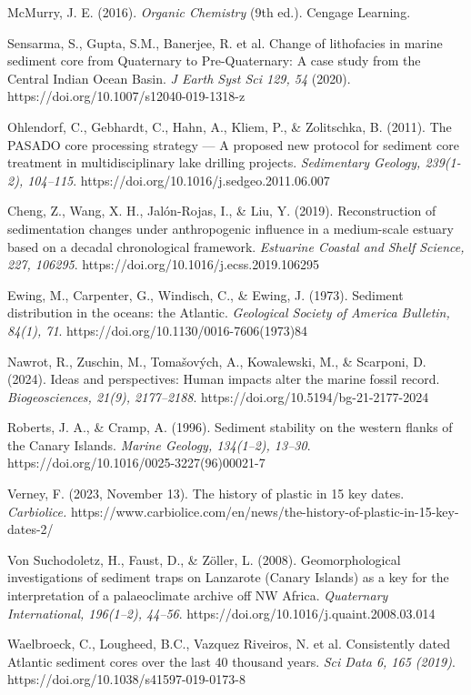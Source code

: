 \documentclass[twocolumn,a4paper,aps,amsmath,amssymb,floatfix,superscriptaddress]{revtex4-2}
\begin{document}
\begin{thebibliography}{99}
		McMurry, J. E. (2016). \textit{Organic Chemistry} (9th ed.). Cengage Learning.
		
		Sensarma, S., Gupta, S.M., Banerjee, R. et al. Change of lithofacies in marine sediment core from Quaternary to Pre-Quaternary: A case study from the Central Indian Ocean Basin. \textit{J Earth Syst Sci 129, 54} (2020). https://doi.org/10.1007/s12040-019-1318-z 
		
		Ohlendorf, C., Gebhardt, C., Hahn, A., Kliem, P., \& Zolitschka, B. (2011). The PASADO core processing strategy — A proposed new protocol for sediment core treatment in multidisciplinary lake drilling projects. \textit{Sedimentary Geology, 239(1-2), 104–115}. https://doi.org/10.1016/j.sedgeo.2011.06.007
		
		Cheng, Z., Wang, X. H., Jalón-Rojas, I., \& Liu, Y. (2019). Reconstruction of sedimentation changes under anthropogenic influence in a medium-scale estuary based on a decadal chronological framework. \textit{Estuarine Coastal and Shelf Science, 227, 106295}. https://doi.org/10.1016/j.ecss.2019.106295
		
		 Ewing, M., Carpenter, G., Windisch, C., \& Ewing, J. (1973). Sediment distribution in the oceans: the Atlantic. \textit{Geological Society of America Bulletin, 84(1), 71}. https://doi.org/10.1130/0016-7606(1973)84
		
		Nawrot, R., Zuschin, M., Tomašových, A., Kowalewski, M., \& Scarponi, D. (2024). Ideas and perspectives: Human impacts alter the marine fossil record. \textit{Biogeosciences, 21(9), 2177–2188}. https://doi.org/10.5194/bg-21-2177-2024
		
		 Roberts, J. A., \& Cramp, A. (1996). Sediment stability on the western flanks of the Canary Islands. \textit{Marine Geology, 134(1–2), 13–30}. https://doi.org/10.1016/0025-3227(96)00021-7
		
		 Verney, F. (2023, November 13). The history of plastic in 15 key dates. \textit{Carbiolice.} https://www.carbiolice.com/en/news/the-history-of-plastic-in-15-key-dates-2/
		
		 Von Suchodoletz, H., Faust, D., \& Zöller, L. (2008). Geomorphological investigations of sediment traps on Lanzarote (Canary Islands) as a key for the interpretation of a palaeoclimate archive off NW Africa. \textit{Quaternary International, 196(1–2), 44–56}. https://doi.org/10.1016/j.quaint.2008.03.014
		
		Waelbroeck, C., Lougheed, B.C., Vazquez Riveiros, N. et al. Consistently dated Atlantic sediment cores over the last 40 thousand years. \textit{Sci Data 6, 165 (2019)}. https://doi.org/10.1038/s41597-019-0173-8
	\end{thebibliography}
	
\end{document}
